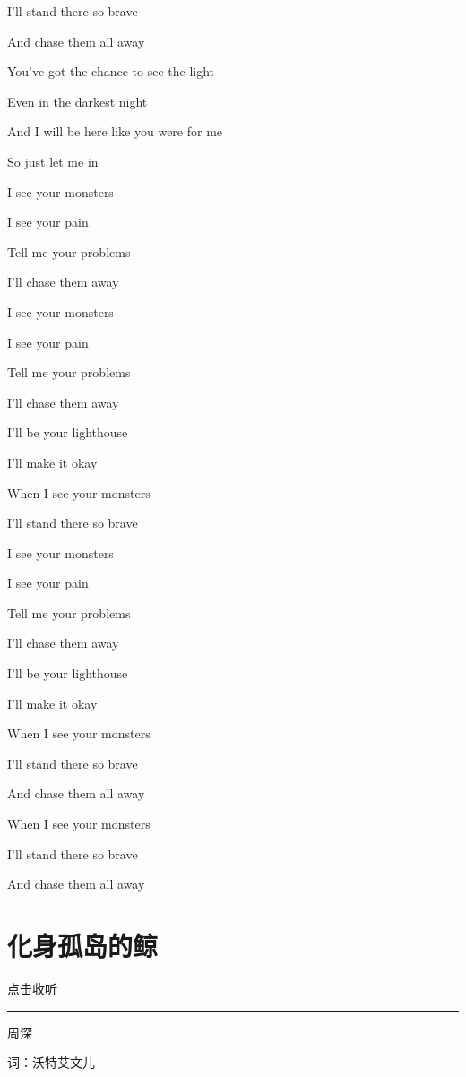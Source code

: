 \documentclass[
]{book}
\begin{document}
I'll stand there so brave

And chase them all away

You've got the chance to see the light

Even in the darkest night

And I will be here like you were for me

So just let me in

I see your monsters

I see your pain

Tell me your problems

I'll chase them away

I see your monsters

I see your pain

Tell me your problems

I'll chase them away

I'll be your lighthouse

I'll make it okay

When I see your monsters

I'll stand there so brave

I see your monsters

I see your pain

Tell me your problems

I'll chase them away

I'll be your lighthouse

I'll make it okay

When I see your monsters

I'll stand there so brave

And chase them all away

When I see your monsters

I'll stand there so brave

And chase them all away

\section*{化身孤岛的鲸}\label{hua-shen-gu-dao-de-jing}

\href{https://y.qq.com/n/ryqq/songDetail/0004adDk3wsULz}{点击收听}

\begin{center}\rule{0.5\linewidth}{0.5pt}\end{center}

周深

词：沃特艾文儿
\end{document}
